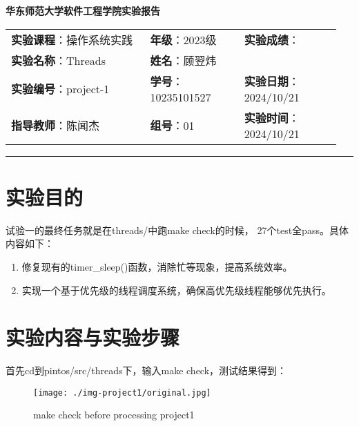 \documentclass{article}
\begin{document}
	\begin{center}
		{\Large{\textbf{\heiti 华东师范大学软件工程学院实验报告}}}
		\begin{table}[htb]
			\flushleft
			\begin{tabular}{p{0.4\linewidth}p{0.27\linewidth}p{0.28\linewidth}}\\
				\textbf{实验课程}：操作系统实践  & \textbf{年级}：2023级       & \textbf{实验成绩}：  \\
				\textbf{实验名称}：Threads & \textbf{姓名}：顾翌炜         &                 \\
				\textbf{实验编号}：project-1     & \textbf{学号}：10235101527 & \textbf{实验日期}：2024/10/21  \\
				\textbf{指导教师}：陈闻杰     & \textbf{组号}：01            & \textbf{实验时间}：2024/10/21  \\ 
			\end{tabular}
		\end{table}
	\end{center}
	\rule{\textwidth}{2pt}
	
	\section{实验目的}
	
	试验一的最终任务就是在threads/中跑make check的时候， 27个test全pass。具体内容如下：
	\begin{enumerate}[noitemsep, label={{\arabic*})}]
		\item 修复现有的timer\_sleep()函数，消除忙等现象，提高系统效率。
		\item 实现一个基于优先级的线程调度系统，确保高优先级线程能够优先执行。
	\end{enumerate}
	\normalsize
	
	\section{实验内容与实验步骤}
	
	首先cd到pintos/src/threads下，输入make check，测试结果得到：
	
    \begin{figure}[h]
    	\centering
    	\texttt{[image: ./img-project1/original.jpg]}
    	\caption{make check before processing project1}
    	\label{fig:graph1}
    \end{figure}
    
\end{document}
